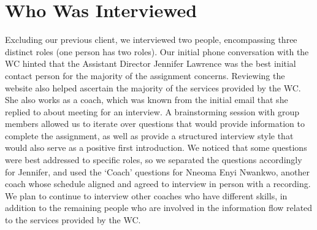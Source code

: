 \documentclass[12pt]{article} %
\begin{document}
\section{Who Was Interviewed} %
Excluding our previous client, we interviewed two people, encompassing three distinct roles (one person has two roles).
Our initial phone conversation with the WC hinted that the Assistant Director Jennifer Lawrence was the best initial contact person for the majority of the assignment concerns.
Reviewing the website also helped ascertain the majority of the services provided by the WC.
She also works as a coach, which was known from the initial email that she replied to about meeting for an interview.
A brainstorming session with group members allowed us to iterate over questions that would provide information to complete the assignment, as well as provide a structured interview style that would also serve as a positive first introduction.
We noticed that some questions were best addressed to specific roles, so we separated the questions accordingly for Jennifer, and used the `Coach' questions for Nneoma Enyi Nwankwo, another coach whose schedule aligned and agreed to interview in person with a recording.
We plan to continue to interview other coaches who have different skills, in addition to the remaining people who are involved in the information flow related to the services provided by the WC.
\end{document}

